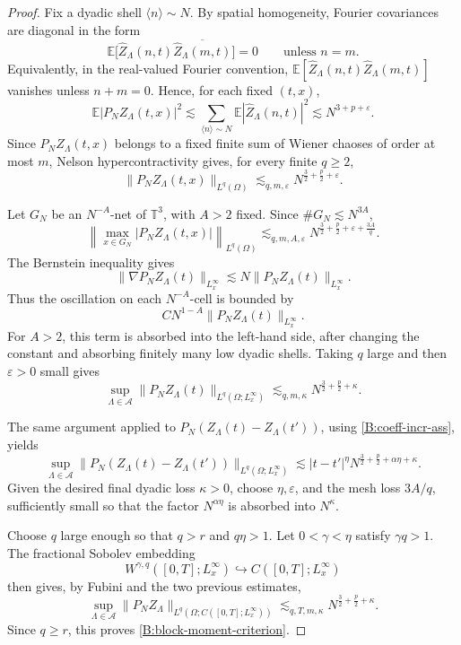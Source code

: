 \documentclass[10pt]{amsart}
\numberwithin{equation}{section}
\theoremstyle{plain}
\theoremstyle{definition}
\theoremstyle{remark}
\newcommand{\T}{\mathbb{T}}
\newcommand{\E}{\mathbb{E}}
\newcommand{\eps}{\varepsilon}
\newcommand{\la}{\langle}
\newcommand{\ra}{\rangle}
\begin{document}
\begin{proof}
Fix a dyadic shell \(\la n\ra\sim N\).  By spatial homogeneity, Fourier covariances are diagonal in the form
\[
        \E\bigl[\widehat Z_\Lambda(n,t)\overline{\widehat Z_\Lambda(m,t)}\bigr]=0
        \qquad\text{unless }n=m.
\]
Equivalently, in the real-valued Fourier convention, \(\E[\widehat Z_\Lambda(n,t)\widehat Z_\Lambda(m,t)]\) vanishes unless \(n+m=0\).  Hence, for each fixed \((t,x)\),
\[
        \E|P_NZ_\Lambda(t,x)|^2
        \lesssim
        \sum_{\la n\ra\sim N}\E|\widehat Z_\Lambda(n,t)|^2
        \lesssim
        N^{3+p+\eps}.
\]
Since \(P_NZ_\Lambda(t,x)\) belongs to a fixed finite sum of Wiener chaoses of order at most \(m\), Nelson hypercontractivity gives, for every finite \(q\ge2\),
\[
        \|P_NZ_\Lambda(t,x)\|_{L^q(\Omega)}
        \lesssim_{q,m,\eps}
        N^{\frac{3}{2}+\frac{p}{2}+\eps}.
\]

Let \(G_N\) be an \(N^{-A}\)-net of \(\T^3\), with \(A>2\) fixed.  Since \(\#G_N\lesssim N^{3A}\),
\[
        \left\|\max_{x\in G_N}|P_NZ_\Lambda(t,x)|\right\|_{L^q(\Omega)}
        \lesssim_{q,m,A,\eps}
        N^{\frac{3}{2}+\frac{p}{2}+\eps+\frac{3A}{q}}.
\]
The Bernstein inequality gives
\[
        \|\nabla P_NZ_\Lambda(t)\|_{L^\infty_x}
        \lesssim N\|P_NZ_\Lambda(t)\|_{L^\infty_x}.
\]
Thus the oscillation on each \(N^{-A}\)-cell is bounded by
\[
        C N^{1-A}\|P_NZ_\Lambda(t)\|_{L^\infty_x}.
\]
For \(A>2\), this term is absorbed into the left-hand side, after changing the constant and absorbing finitely many low dyadic shells.  Taking \(q\) large and then \(\eps>0\) small gives
\[
        \sup_{\Lambda\in\mathcal A}
        \|P_NZ_\Lambda(t)\|_{L^q(\Omega;L^\infty_x)}
        \lesssim_{q,m,\kappa}
        N^{\frac{3}{2}+\frac{p}{2}+\kappa}.
\]

The same argument applied to \(P_N(Z_\Lambda(t)-Z_\Lambda(t'))\), using \eqref{B:coeff-incr-ass}, yields
\[
        \sup_{\Lambda\in\mathcal A}
        \|P_N(Z_\Lambda(t)-Z_\Lambda(t'))\|_{L^q(\Omega;L^\infty_x)}
        \lesssim
        |t-t'|^\eta
        N^{\frac{3}{2}+\frac{p}{2}+\alpha\eta+\kappa}.
\]
Given the desired final dyadic loss \(\kappa>0\), choose \(\eta,\eps\), and the mesh loss \(3A/q\), sufficiently small so that the factor \(N^{\alpha\eta}\) is absorbed into \(N^\kappa\).

Choose \(q\) large enough so that \(q>r\) and \(q\eta>1\).  Let \(0<\gamma<\eta\) satisfy \(\gamma q>1\).  The fractional Sobolev embedding
\[
        W^{\gamma,q}([0,T];L^\infty_x)\hookrightarrow C([0,T];L^\infty_x)
\]
then gives, by Fubini and the two previous estimates,
\[
        \sup_{\Lambda\in\mathcal A}
        \|P_NZ_\Lambda\|_{L^q(\Omega;C([0,T];L^\infty_x))}
        \lesssim_{q,T,m,\kappa}
        N^{\frac{3}{2}+\frac{p}{2}+\kappa}.
\]
Since \(q\ge r\), this proves \eqref{B:block-moment-criterion}.


\end{proof}
\end{document}
